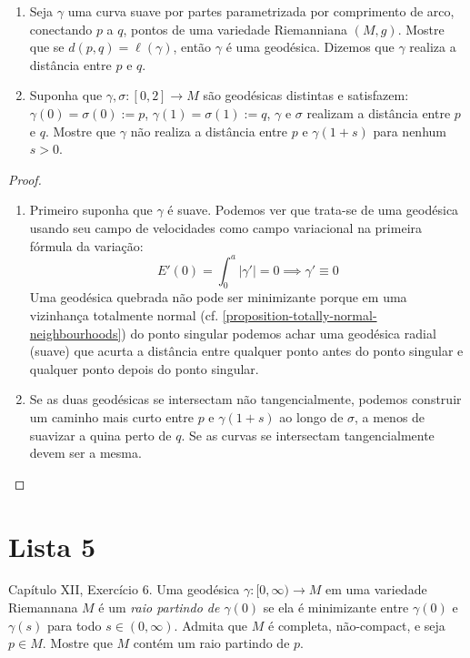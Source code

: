 \begin{exercise}
\label{exercise-curvas-minimizantes}
\begin{enumerate}
\item Seja $\gamma$ uma curva suave por partes parametrizada por comprimento de
 arco, conectando $p$ a $q$, pontos de uma variedade Riemanniana $(M,g)$.
 Mostre que se $d(p,q)=\ell(\gamma)$, então $\gamma$ é uma geodésica.
 Dizemos que $\gamma$ realiza a distância entre $p$ e $q$.
\item Suponha que $\gamma,\sigma:[0,2]\to M$ são geodésicas distintas
 e satisfazem: $\gamma(0)=\sigma(0):=p$, $\gamma(1)=\sigma(1):=q$, 
$\gamma$ e $\sigma$ realizam a distância entre $p$ e $q$.
 Mostre que $\gamma$ não realiza a distância entre $p$ e $\gamma(1+s)$ 
para nenhum $s>0$.
\end{enumerate}
\end{exercise}

\begin{proof}
\begin{enumerate}
\item Primeiro suponha que $\gamma$ é suave. Podemos ver que trata-se de uma 
geodésica usando seu campo de velocidades como campo variacional na primeira
fórmula da variação:
$$
E'(0)=\int_0^a |\gamma'|=0 \implies \gamma'\equiv 0
$$
Uma geodésica quebrada não pode ser minimizante porque em uma vizinhança 
totalmente normal (cf. \ref{proposition-totally-normal-neighbourhoods}) 
do ponto singular podemos achar uma geodésica radial (suave)
 que acurta a distância entre qualquer ponto antes do ponto singular
 e qualquer ponto depois do ponto singular.
\item Se as duas geodésicas se intersectam não tangencialmente, podemos 
construir um caminho mais curto entre $p$ e $\gamma(1+s)$ ao longo de $\sigma$,
a menos de suavizar a quina perto de $q$. Se as curvas se intersectam
 tangencialmente devem ser a mesma.
\end{enumerate}
\end{proof}

\section{Lista 5}
\label{section-lista-5}

\begin{exercise}
\label{exercise-l5-5}
\cite{doc} Capítulo XII, Exercício 6. Uma geodésica $\gamma:[0,\infty)\to M$ em
uma variedade Riemannana $M$ é um {\it raio partindo de $\gamma(0)$} se ela é
minimizante entre $\gamma(0)$ e $\gamma(s)$ para todo  $s \in (0,\infty)$.
Admita que $M$ é completa, não-compact, e seja $p \in M$. Mostre que $M$ contém
um raio partindo de $p$.
\end{exercise}

